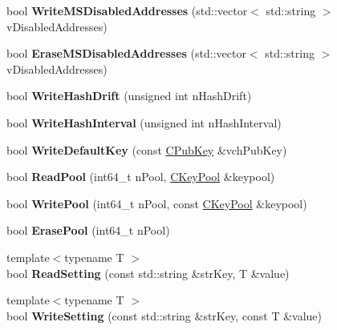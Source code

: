 \begin{DoxyCompactItemize}
bool {\bfseries Write\+M\+S\+Disabled\+Addresses} (std\+::vector$<$ std\+::string $>$ v\+Disabled\+Addresses)
\item 
\mbox{\label{class_c_wallet_d_b_ad0cdb58cbf268a56e463735b5290bbda}} 
bool {\bfseries Erase\+M\+S\+Disabled\+Addresses} (std\+::vector$<$ std\+::string $>$ v\+Disabled\+Addresses)
\item 
\mbox{\label{class_c_wallet_d_b_aa8d2162573f51c87f9dd9fb0472960a7}} 
bool {\bfseries Write\+Hash\+Drift} (unsigned int n\+Hash\+Drift)
\item 
\mbox{\label{class_c_wallet_d_b_aa88acb018f05dd7efab011c3054f28d7}} 
bool {\bfseries Write\+Hash\+Interval} (unsigned int n\+Hash\+Interval)
\item 
\mbox{\label{class_c_wallet_d_b_a1d925af18104900bddd19c968a0402b5}} 
bool {\bfseries Write\+Default\+Key} (const \mbox{\hyperlink{class_c_pub_key}{C\+Pub\+Key}} \&vch\+Pub\+Key)
\item 
\mbox{\label{class_c_wallet_d_b_a6a03927cf247314ccd9b285139de0bd1}} 
bool {\bfseries Read\+Pool} (int64\+\_\+t n\+Pool, \mbox{\hyperlink{class_c_key_pool}{C\+Key\+Pool}} \&keypool)
\item 
\mbox{\label{class_c_wallet_d_b_ad43630ad28a68c3e8b1a633f09aa0964}} 
bool {\bfseries Write\+Pool} (int64\+\_\+t n\+Pool, const \mbox{\hyperlink{class_c_key_pool}{C\+Key\+Pool}} \&keypool)
\item 
\mbox{\label{class_c_wallet_d_b_ac78d839fbda5164c4134ab67911139ca}} 
bool {\bfseries Erase\+Pool} (int64\+\_\+t n\+Pool)
\item 
\mbox{\label{class_c_wallet_d_b_a15f6d86daee02ed37a7149250a524675}} 
{\footnotesize template$<$typename T $>$ }\\bool {\bfseries Read\+Setting} (const std\+::string \&str\+Key, T \&value)
\item 
\mbox{\label{class_c_wallet_d_b_aa0faef0a2452b673789d107782c51ea0}} 
{\footnotesize template$<$typename T $>$ }\\bool {\bfseries Write\+Setting} (const std\+::string \&str\+Key, const T \&value)

\end{DoxyCompactItemize}
